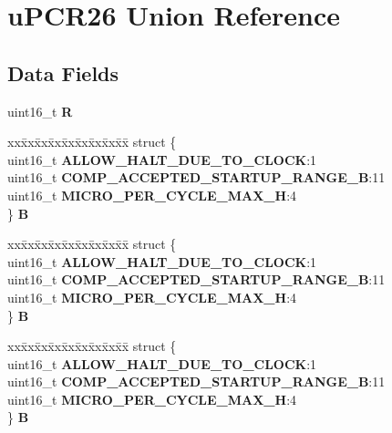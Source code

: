 \hypertarget{unionuPCR26}{}\section{u\+P\+C\+R26 Union Reference}
\label{unionuPCR26}
\subsection*{Data Fields}
\begin{DoxyCompactItemize}
\item 
\mbox{\label{unionuPCR26_a511e60e9accb41175b20aead54936b8d}} 
uint16\+\_\+t {\bfseries R}
\item 
\mbox{\label{unionuPCR26_a24d28331668a8897bc4cbb4891f6d9ea}} 
\begin{tabbing}
xx\=xx\=xx\=xx\=xx\=xx\=xx\=xx\=xx\=\kill
struct \{\\
\>uint16\_t {\bfseries ALLOW\_HALT\_DUE\_TO\_CLOCK}:1\\
\>uint16\_t {\bfseries COMP\_ACCEPTED\_STARTUP\_RANGE\_B}:11\\
\>uint16\_t {\bfseries MICRO\_PER\_CYCLE\_MAX\_H}:4\\
\} {\bfseries B}\\

\end{tabbing}\item 
\mbox{\label{unionuPCR26_a1994130076fe34f0640a34fc728b4704}} 
\begin{tabbing}
xx\=xx\=xx\=xx\=xx\=xx\=xx\=xx\=xx\=\kill
struct \{\\
\>uint16\_t {\bfseries ALLOW\_HALT\_DUE\_TO\_CLOCK}:1\\
\>uint16\_t {\bfseries COMP\_ACCEPTED\_STARTUP\_RANGE\_B}:11\\
\>uint16\_t {\bfseries MICRO\_PER\_CYCLE\_MAX\_H}:4\\
\} {\bfseries B}\\

\end{tabbing}\item 
\mbox{\label{unionuPCR26_a9f40258870d3bb4d9425fbe080056698}} 
\begin{tabbing}
xx\=xx\=xx\=xx\=xx\=xx\=xx\=xx\=xx\=\kill
struct \{\\
\>uint16\_t {\bfseries ALLOW\_HALT\_DUE\_TO\_CLOCK}:1\\
\>uint16\_t {\bfseries COMP\_ACCEPTED\_STARTUP\_RANGE\_B}:11\\
\>uint16\_t {\bfseries MICRO\_PER\_CYCLE\_MAX\_H}:4\\
\} {\bfseries B}\\


\end{tabbing}
\end{DoxyCompactItemize}
